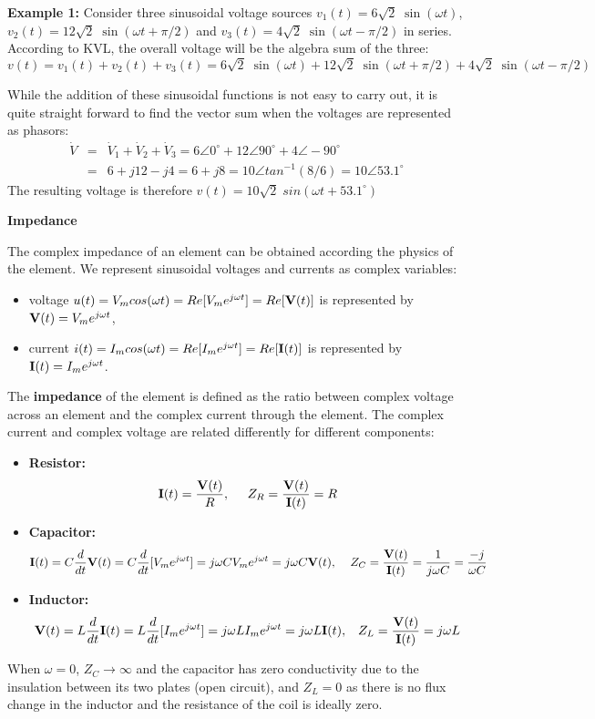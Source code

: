 {\bf Example 1:} Consider three sinusoidal voltage sources 
$v_1(t)=6\sqrt{2}\;\sin(\omega t)$, $v_2(t)=12\sqrt{2}\;\sin(\omega t+\pi/2)$
and $v_3(t)=4\sqrt{2}\;\sin(\omega t-\pi/2)$ in series. According to KVL,
the overall voltage will be the algebra sum of the three:
\[ 	v(t)=v_1(t)+v_2(t)+v_3(t)
	=6\sqrt{2}\;\sin(\omega t)+12\sqrt{2}\;\sin(\omega t+\pi/2)
	+4\sqrt{2}\;\sin(\omega t-\pi/2)	\]


While the addition of these sinusoidal functions is not easy to carry out, 
it is quite straight forward to find the vector sum when the voltages are
represented as phasors:
\begin{eqnarray}
\dot{V}&=&\dot{V}_1+\dot{V}_2+\dot{V}_3=6\angle 0^\circ+12\angle 90^\circ+
	4\angle -90^\circ	
	\nonumber \\
	&=&6+j12-j4=6+j8=10 \angle tan^{-1}(8/6)
	=10\angle 53.1^\circ	\nonumber \end{eqnarray}
The resulting voltage is therefore $v(t)=10\sqrt{2}\;sin(\omega t+53.1^\circ)$



{\bf Impedance}

The complex impedance of an element can be obtained according the physics
of the element. We represent sinusoidal voltages and currents as complex
variables:
\begin{itemize}
\item voltage $u(t)=V_m cos(\omega t)=Re[V_m e^{j\omega t}]=Re[{\bf V}(t)]$
	is represented by ${\bf V}(t)=V_m e^{j\omega t}$,
\item current $i(t)=I_m cos(\omega t)=Re[I_m e^{j\omega t}]=Re[{\bf I}(t)]$
	is represented by ${\bf I}(t)=I_m e^{j\omega t}$.
\end{itemize}
The {\bf impedance} of the element is defined as the ratio between complex 
voltage across an element and the complex current through the element.
The complex current and complex voltage are related differently for
different components:
\begin{itemize}
\item {\bf Resistor:} 
\[	{\bf I}(t)=\frac{{\bf V}(t)}{R},\;\;\;\;\;Z_R=\frac{{\bf V}(t)}{{\bf I}(t)}=R	\]
\item {\bf Capacitor:} 
\[	{\bf I}(t)=C \frac{d}{dt}{\bf V}(t)=C\frac{d}{dt}[V_m e^{j\omega t}]
	=j\omega C V_m e^{j\omega t}=j\omega C {\bf V}(t),\;\;\;\;
	Z_C=\frac{{\bf V}(t)}{{\bf I}(t)}=\frac{1}{j\omega C}=\frac{-j}{\omega C}
\]
\item {\bf Inductor:}
\[	{\bf V}(t)=L \frac{d}{dt}{\bf I}(t)=L\frac{d}{dt}[I_m e^{j\omega t}]
	=j\omega L I_m e^{j\omega t}=j\omega L {\bf I}(t),\;\;\;
	Z_L=\frac{{\bf V}(t)}{{\bf I}(t)}=j\omega L	\]
\end{itemize}
When $\omega=0$, $Z_C\rightarrow \infty$ and the capacitor has zero 
conductivity due to the insulation between its two plates (open circuit),
and $Z_L=0$ as there is no flux change in the inductor and the resistance 
of the coil is ideally zero.

